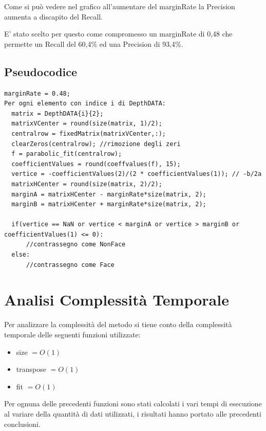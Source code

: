 \documentclass[
  italian,
]{article}
\providecommand{\tightlist}{%
  \setlength{\itemsep}{0pt}\setlength{\parskip}{0pt}}
\begin{document}
Come si può vedere nel grafico all'aumentare del marginRate la Precision
aumenta a discapito del Recall.

E' stato scelto per questo come compromesso un marginRate di 0,48 che permette un Recall del 60,4\% ed una Precision di 93,4\%.

\pagebreak 

\hypertarget{pseudocodice}{%
\subsection{Pseudocodice}\label{pseudocodice}}

\begin{lstlisting}[basicstyle=\small]
marginRate = 0.48;
Per ogni elemento con indice i di DepthDATA:
  matrix = DepthDATA{i}{2}; 
  matrixVCenter = round(size(matrix, 1)/2);
  centralrow = fixedMatrix(matrixVCenter,:);
  clearZeros(centralrow); //rimozione degli zeri
  f = parabolic_fit(centralrow);
  coefficientValues = round(coeffvalues(f), 15);
  vertice = -coefficientValues(2)/(2 * coefficientValues(1)); // -b/2a
  matrixHCenter = round(size(matrix, 2)/2);
  marginA = matrixHCenter - marginRate*size(matrix, 2);
  marginB = matrixHCenter + marginRate*size(matrix, 2);
  
  if(vertice == NaN or vertice < marginA or vertice > marginB or coefficientValues(1) <= 0):
      //contrassegno come NonFace
  else:
      //contrassegno come Face
\end{lstlisting}


\hypertarget{analisi-complessituxe0-temporale}{%
\section{Analisi Complessità
Temporale}\label{analisi-complessituxe0-temporale}}

Per analizzare la complessità del metodo si tiene conto della
complessità temporale delle seguenti funzioni utilizzate:

\begin{itemize}
\tightlist
\item
  size \(= O(1)\)
\item
  transpose \(= O(1)\)
\item
  fit \(= O(1)\)
\end{itemize}

Per ognuna delle precedenti funzioni sono stati calcolati i vari tempi
di esecuzione al variare della quantità di dati utilizzati, i risultati
hanno portato alle precedenti conclusioni.
\end{document}
